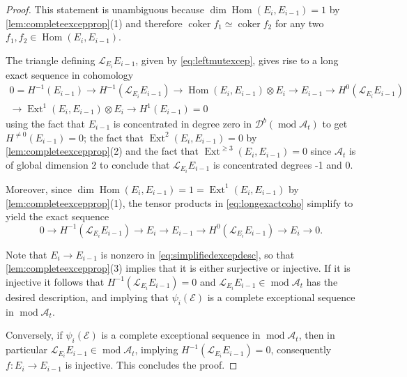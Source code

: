 \documentclass[10pt,a4paper]{amsart}
\newcommand{\A}{\mathscr{A}}
\newcommand{\Dcal}{\mathcal{D}}
\newcommand{\Ecal}{\mathcal{E}}
\DeclareMathOperator{\Ext}{Ext}
\DeclareMathOperator{\Hom}{Hom}
\newcommand{\Lcal}{\mathcal{L}}
\DeclareMathOperator{\coker}{coker}
\DeclareMathOperator{\mods}{mod}
\begin{document}
\begin{proof}
    This statement is unambiguous because $\dim \Hom(E_{i}, E_{i-1})=1$ by \cref{lem:completeexcepprop}(1) and therefore $\coker f_1 \simeq \coker f_2$ for any two $f_1, f_2 \in \Hom(E_i, E_{i-1})$. 

    The triangle defining $\Lcal_{E_i} E_{i-1}$, given by \cref{eq:leftmutexcep}, gives rise to a long exact sequence in cohomology
    \begin{equation}\begin{aligned}\label{eq:longexactcoho} 0 = H^{-1}(E_{i-1}) \to H^{-1}(\Lcal_{E_i} E_{i-1}) \to \Hom(E_i, E_{i-1})\otimes E_i \to E_{i-1} \to H^0(\Lcal_{E_i} E_{i-1}) \\
    \to \Ext^1(E_i, E_{i-1}) \otimes E_i \to H^1(E_{i-1}) = 0
    \end{aligned}\end{equation}
    using the fact that $E_{i-1}$ is concentrated in degree zero in $\Dcal^b(\mods \A_t)$ to get $H^{\neq 0}(E_{i-1})= 0$; the fact that $\Ext^2(E_i, E_{i-1})= 0$ by \cref{lem:completeexcepprop}(2) and the fact that $\Ext^{\geq 3}(E_i, E_{i-1}) = 0$ since $\A_t$ is of global dimension 2 to conclude that $\Lcal_{E_i} E_{i-1}$ is concentrated degrees -1 and 0. 

    Moreover, since $\dim \Hom(E_i, E_{i-1})=1 = \Ext^1(E_i, E_{i-1})$ by \cref{lem:completeexcepprop}(1), the tensor products in \cref{eq:longexactcoho} simplify to yield the exact sequence
    \begin{equation}\label{eq:simplifiedexcepdesc} 0 \to H^{-1}(\Lcal_{E_i} E_{i-1}) \to E_i \to E_{i-1} \to H^0(\Lcal_{E_i} E_{i-1}) \to E_i \to 0. \end{equation}

    Note that $E_i \to E_{i-1}$ is nonzero in \cref{eq:simplifiedexcepdesc}, so that \cref{lem:completeexcepprop}(3) implies that it is either surjective or injective. If it is injective it follows that $H^{-1}(\Lcal_{E_i} E_{i-1})=0$ and $\Lcal_{E_i} E_{i-1} \in \mods \A_t$ has the desired description, and implying that $\psi_i(\Ecal)$ is a complete exceptional sequence in $\mods \A_t$. 

    Conversely, if $\psi_i(\Ecal)$ is a complete exceptional sequence in $\mods \A_t$, then in particular $\Lcal_{E_i} E_{i-1} \in \mods \A_t$, implying $H^{-1}(\Lcal_{E_i} E_{i-1}) = 0$, consequently $f: E_i \to E_{i-1}$ is injective. This concludes the proof.
\end{proof}
\end{document}
